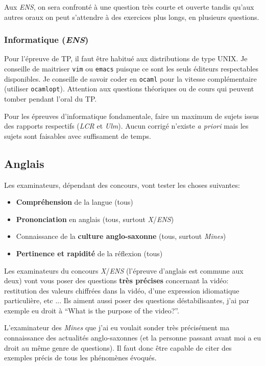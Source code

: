 \documentclass{article}
\begin{document}
Aux \textit{ENS}, on sera confronté à une question très courte et ouverte tandis qu'aux autres oraux on peut s'attendre à des exercices plus longs, en plusieurs questions.

\subsubsection{Informatique (\textit{ENS})}
Pour l'épreuve de TP, il faut être habitué aux distributions de type UNIX.
Je conseille de maitriser \texttt{vim} ou \texttt{emacs} puisque ce sont les seuls éditeurs respectables disponibles.
Je conseille de savoir coder en \texttt{ocaml} pour la vitesse complémentaire (utiliser \texttt{ocamlopt}).
Attention aux questions théoriques ou de cours qui peuvent tomber pendant l'oral du TP.

Pour les épreuves d'informatique fondamentale, faire un maximum de sujets issus des rapports respectifs (\textit{LCR} et \textit{Ulm}).
Aucun corrigé n'existe \textit{a priori} mais les sujets sont faisables avec suffisament de temps.

\subsection{Anglais}
Les examinateurs, dépendant des concours, vont tester les choses suivantes:


\begin{itemize}
\item  \textbf{Compréhension} de la langue (tous)
\item  \textbf{Prononciation} en anglais (tous, surtout \textit{X}/\textit{ENS})
\item  Connaissance de la \textbf{culture anglo-saxonne} (tous, surtout \textit{Mines})
\item  \textbf{Pertinence et rapidité} de la réflexion (tous)

\end{itemize}

Les examinateurs du concours \textit{X}/\textit{ENS} (l'épreuve d'anglais est commune aux deux) vont vous poser des questions \textbf{très précises} concernant la vidéo: restitution des valeurs chiffrées dans la vidéo, d'une expression idiomatique particulière, etc ...
Ils aiment aussi poser des questions déstabilisantes, j'ai par exemple eu droit à ``What is the purpose of the video?''.

L'examinateur des \textit{Mines} que j'ai eu voulait sonder très précisément ma connaissance des actualités anglo-saxonnes (et la personne passant avant moi a eu droit au même genre de questions).
Il faut donc être capable de citer des exemples précis de tous les phénomènes évoqués.
\end{document}
